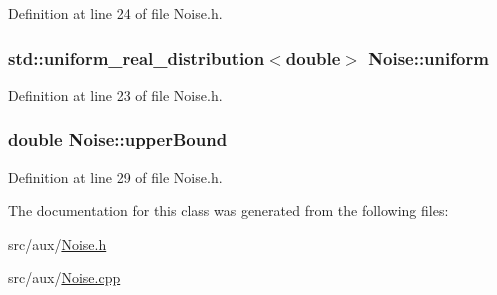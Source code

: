 Definition at line 24 of file Noise.\-h.

\hypertarget{class_noise_aa7025a1f6193c8cf2ce4d225b9f9413f}{
\subsubsection[{uniform}]{\setlength{\rightskip}{0pt plus 5cm}std\-::uniform\-\_\-real\-\_\-distribution$<$double$>$ Noise\-::uniform\hspace{0.3cm}{\ttfamily [protected]}}}\label{class_noise_aa7025a1f6193c8cf2ce4d225b9f9413f}


Definition at line 23 of file Noise.\-h.

\hypertarget{class_noise_ae4e9a84fa020eac595826a7a9a95bcb6}{
\subsubsection[{upper\-Bound}]{\setlength{\rightskip}{0pt plus 5cm}double Noise\-::upper\-Bound}}\label{class_noise_ae4e9a84fa020eac595826a7a9a95bcb6}


Definition at line 29 of file Noise.\-h.



The documentation for this class was generated from the following files\-:\begin{DoxyCompactItemize}
\item 
src/aux/\hyperlink{_noise_8h}{Noise.\-h}\item 
src/aux/\hyperlink{_noise_8cpp}{Noise.\-cpp}\end{DoxyCompactItemize}
